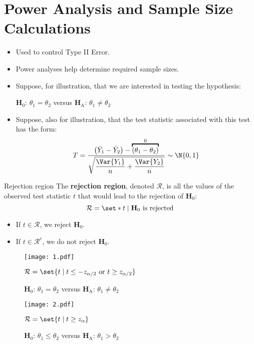 \section{Power Analysis and Sample Size Calculations}
\begin{itemize}
    \item Used to control Type II Error.
    \item Power analyses help determine required sample sizes.
    \item Suppose, for illustration, that we are interested in testing the hypothesis:
          \begin{tightcenter}
              $ \mathbf{H}_0 $: $ \theta_1=\theta_2 $ versus $ \mathbf{H}_\text{A} $: $ \theta_1\ne \theta_2 $
          \end{tightcenter}
    \item Suppose, also for illustration, that the test statistic associated with this test has
          the form:
          \[ T=\frac{\bigl(\bar{Y}_1-\bar{Y}_2\bigr)-\overbracket{(\theta_1-\theta_2)}^0}{\displaystyle \sqrt{\frac{\Var{Y_1}}{n}+\frac{\Var{Y_2}}{n} }}\sim \N{0,1}  \]
\end{itemize}
\begin{Definition}{Rejection region}{}
    The \textbf{rejection region}, denoted $ \mathcal{R} $, is
    all the values of the observed test statistic $ t $ that would lead to the rejection
    of $ \mathbf{H}_0 $:
    \[ \mathcal{R}=\set*{t\mid \mathbf{H}_0\text{ is rejected}} \]
\end{Definition}
\begin{itemize}
    \item If $ t\in\mathcal{R} $, we reject $ \mathbf{H}_0 $.
    \item If $ t\in\mathcal{R}^c $, we do not reject $ \mathbf{H}_0 $.
\end{itemize}
\begin{figure}[!htbp]
    \centering
    \texttt{[image: 1.pdf]}
    \caption{$ \mathbf{H}_0 $: $ \theta_1=\theta_2 $ versus $ \mathbf{H}_\text{A} $: $ \theta_1\ne \theta_2 $}{$ \mathcal{R}=\set{t\mid t\le -z_{\alpha/2}\text{ or }t\ge z_{\alpha/2}} $}
\end{figure}
\begin{figure}[!htbp]
    \centering
    \texttt{[image: 2.pdf]}
    \caption{$ \mathbf{H}_0 $: $ \theta_1\le\theta_2 $ versus $ \mathbf{H}_\text{A} $: $ \theta_1>\theta_2 $}{$ \mathcal{R}=\set{t\mid t\ge z_{\alpha}} $}
\end{figure}
